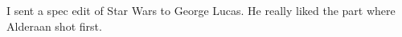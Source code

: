 \item I sent a spec edit of Star Wars to George Lucas. He really liked
  the part where Alderaan shot first.